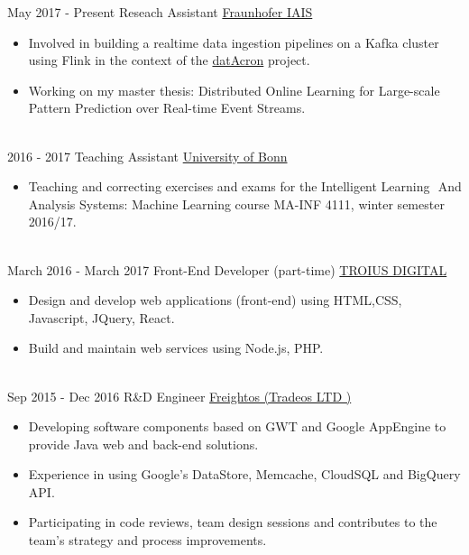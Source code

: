 \documentclass[letterpaper]{twentysecondcv} %
\begin{document}
\begin{twenty} %
	
	\twentyitem
	{May 2017 -}
	{Present}
	{Reseach Assistant}
	{\href{https://www.iais.fraunhofer.de/?L=1}{Fraunhofer IAIS}}
	{}
	{\begin{itemize}
			\item Involved in building a realtime data ingestion pipelines on a Kafka cluster using Flink in the context of the \href{http://www.datacron-project.eu/}{datAcron} project.
			
			\item Working on my master thesis: Distributed Online Learning for Large-scale Pattern Prediction over Real-time Event Streams.
	\end{itemize}}
\\
		\twentyitem
	{2016 - 2017}
	{}
	{Teaching Assistant}
	{\href{https://www.kdml.iai.uni-bonn.de/teaching/winter-2016-17}{University of Bonn}}
	{}
	 {\begin{itemize}
			\item Teaching and correcting exercises and exams for the Intelligent Learning ​ And Analysis Systems: Machine Learning course  MA-INF 4111, winter semester 2016/17.
	\end{itemize}}


        \\
	\twentyitem
    	{March 2016 -}
		{March 2017}
        {Front-End Developer (part-time)}
        {\href{https://twitter.com/TROIUS_DIGITAL}{TROIUS DIGITAL}}
        {}
        {
        {\begin{itemize}
        \item Design and develop web applications (front-end) using HTML,CSS, Javascript, JQuery, React.
        \item Build and maintain web services using Node.js, PHP.
    \end{itemize}}
        }
    \\   
    \twentyitem
   		{Sep 2015 -}
		{Dec 2016}
        {R\&D Engineer}
        {\href{https://www.freightos.com/}{Freightos (Tradeos LTD )}}
        {}
        {
        {\begin{itemize}
        \item Developing software components based on  GWT and Google AppEngine to provide Java web and back-end solutions.
        \item Experience in using Google's DataStore, Memcache, CloudSQL and BigQuery API.
        \item Participating in code reviews, team design sessions and contributes to the team’s strategy and process improvements.
        

\end{itemize}}}
\end{twenty}
\end{document}
